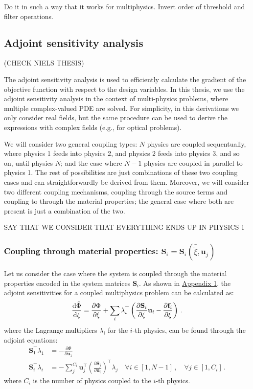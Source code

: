 Do it in such a way that it works for multiphysics.
Invert order of threshold and filter operations.

\subsection{Adjoint sensitivity analysis}

(CHECK NIELS THESIS)

The adjoint sensitivity analysis is used to efficiently calculate the gradient of the objective function with 
respect to the design variables. In this thesis, we use the adjoint sensitivity analysis  in the context of 
multi-physics problems, where multiple complex-valued PDE are solved. For simplicity, in this derivations we only consider
real fields, but the same procedure can be used to derive the expressions with complex fields (e.g., for optical problems).

We will consider two  general coupling types: $N$ physics are coupled sequentually, where physics 1 feeds into physics 2, and physics 2 
feeds into physics 3, and so on, until physics $N$; and the case where $N-1$ physics are coupled in parallel to physics 1. The rest of possibilities are just 
combinations of these two coupling cases and can straightforwardly be derived from them. Moreover, we will consider two different coupling mechanisms,
coupling through the source terms and coupling to through the material properties; the general case where both are present is just a combination of the two.

SAY THAT WE CONSIDER THAT EVERYTHING ENDS UP IN PHYSICS 1

\subsubsection*{Coupling through material properties: $\mathbf{S}_i = \mathbf{S}_i(\bar{\tilde{\xi}}, \mathbf{u}_j)$}

Let us consider the case where the system is coupled through the material properties encoded in the system
matrices $\mathbf{S}_i$. As shown in \hyperref[app:appendix1]{Appendix 1}, the adjoint sensitivities for a coupled multiphysics problem can be calculated as:
\begin{equation}
    \frac{\mathop{}\!\text{d} \tilde{\Phi}}{\mathop{}\!\text{d} \xi} = \frac{\partial \Phi}{\partial \xi} + \sum_i \lambda_{i}^{\top} \left( \frac{\partial \mathbf{S}_i}{\partial \xi} \mathbf{u}_i - \frac{\partial \mathbf{f}_i}{\partial \xi} \right)\,.
\end{equation}
where the Lagrange multipliers $\lambda_i$ for the $i$-th physics, can be found through the adjoint equations:
\begin{align}
    \mathbf{S}^\top_{1}\lambda_{1} &= - \frac{\partial \Phi}{\partial \mathbf{u}_{1}}\,\\
    \mathbf{S}^\top_{i}\lambda_{i} &= - \sum^{C_i}_j \mathbf{u}^\top_j \left(\frac{\partial \mathbf{S}_j}{\partial \mathbf{u}_{i}}\right)^\top \lambda_j \quad \forall i \in [1, N-1]\, , \quad \forall j \in [1, C_i] \,.
\end{align}
where $C_i$ is the number of physics coupled to the $i$-th physics.




